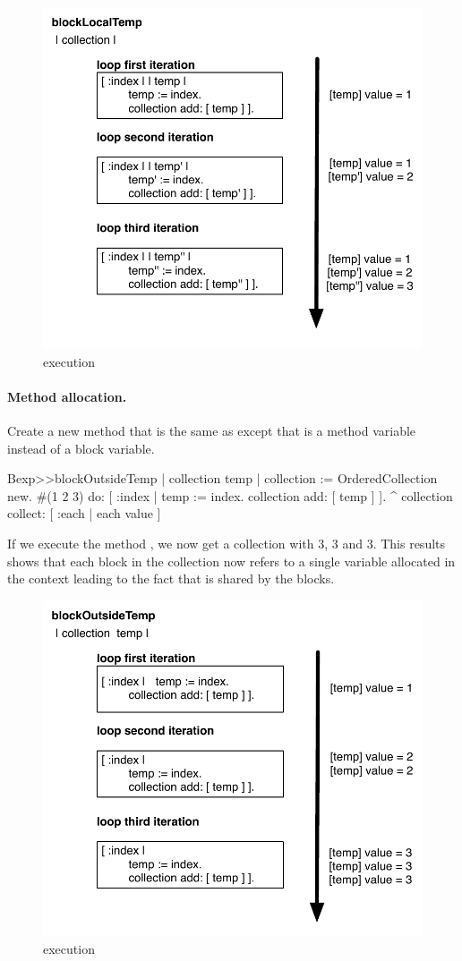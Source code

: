 \documentclass[a4paper,10pt,twoside]{book}
\begin{document}
\begin{figure}
	\centering
        \includegraphics[width=0.7\linewidth]{blockClosureLocalTemp}
	\caption{ execution}
	\label{fig:blockLocalTempExecution}
\end{figure}

\paragraph{Method allocation.} Create a new method that is the same as  except that  is a method variable instead of a block variable.

\begin{code}{}
Bexp>>blockOutsideTemp
	| collection temp |
	collection := OrderedCollection new.
	#(1 2 3) do: [ :index | 
		temp := index.
		collection add: [ temp ] ].
	^ collection collect: [ :each | each value ]
\end{code}

If we execute the method , we now get a collection with 3, 3 and 3. This results shows that each block in the collection now refers to a single variable  allocated in the  context leading to the fact that  is shared by the blocks.

\begin{figure}
	\centering
		\includegraphics[width=0.7\linewidth]{blockClosureOutsideTemp}
	\caption{ execution}
	\label{fig:blockClosureOutsideTemp}
\end{figure}
\end{document}
